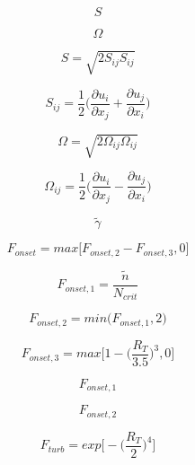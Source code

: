 \begin{equation}
S
\end{equation}

\begin{equation}
\Omega
\end{equation}

\begin{equation}
S = \sqrt{2 S_{ij} S_{ij}}
\end{equation}

\begin{equation}
S_{ij} = \frac{1}{2}\bigg(\frac{\partial u_i}{\partial x_j} + \frac{\partial u_j}{\partial x_i} \bigg)
\end{equation}

\begin{equation}
\Omega = \sqrt{2 \Omega_{ij} \Omega_{ij}}
\end{equation}

\begin{equation}
\Omega_{ij} = \frac{1}{2}\bigg(\frac{\partial u_i}{\partial x_j} - \frac{\partial u_j}{\partial x_i} \bigg)
\end{equation}

\begin{equation}
\tilde{\gamma}
\end{equation}

\begin{equation}
F_{onset} = {max} \Big[ F_{onset,2} - F_{onset,3}, 0 \Big]
\end{equation}

\begin{equation}
F_{onset,1} = \frac{\tilde{n}}{N_{crit}}
\end{equation}

\begin{equation}
F_{onset,2} = {min}\Big(F_{onset,1},2 \Big)
\end{equation}

\begin{equation}
F_{onset,3} = {max} \Big[1 - \Big(\frac{R_T}{3.5}\Big)^3, 0 \Big]
\end{equation}

\begin{equation}
F_{onset,1}
\end{equation}

\begin{equation}
F_{onset,2}
\end{equation}

\begin{equation}
F_{turb} = {exp} \bigg[ - \Big( \frac{R_T}{2} \Big)^4 \bigg]
\end{equation}

